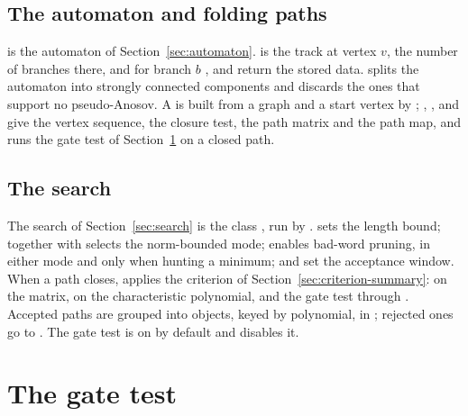 \documentclass[12pt]{amsart}
\theoremstyle{plain}
\theoremstyle{definition}
\begin{document}
\subsection{The automaton and folding paths}
 is the automaton of
Section~\ref{sec:automaton}.   is the track at vertex
$v$,  the number of branches there, and for branch $b$
,  and
 return the stored data.  
splits the automaton into strongly connected components and
 discards the ones that support no pseudo-Anosov.
A  is built from a graph and a start
vertex by ; , ,
 and  give the vertex
sequence, the closure test, the path matrix and the path map, and
 runs the gate test of Section~\ref{sec:impl-gates} on a
closed path.

\subsection{The search}
The search of Section~\ref{sec:search} is the class
, run by .  
sets the length bound;  together with
 selects the norm-bounded mode;
 enables bad-word pruning, in either mode and only
when hunting a minimum; 
and  set the acceptance window.  When a path closes,
 applies the criterion of
Section~\ref{sec:criterion-summary}:  on the matrix,
 on the characteristic polynomial, and the gate test
through .  Accepted paths are grouped into
 objects, keyed by polynomial, in ;
rejected ones go to .  The gate test is on by
default and  disables it.

\section{The gate test}
\label{sec:impl-gates}
\end{document}
